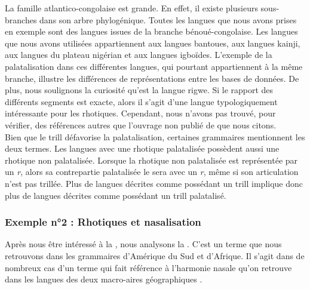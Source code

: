 La famille atlantico-congolaise est grande. En effet, il existe plusieurs sous-branches dans son arbre phylogénique. Toutes les langues que nous avons prises en exemple sont des langues issues de la branche bénoué-congolaise. Les langues que nous avons utilisées appartiennent aux langues bantoues, aux langues kainji, aux langues du plateau nigérian et aux langues igboïdes. L'exemple de la palatalisation dans ces différentes langues, qui pourtant appartiennent à la même branche, illustre les différences de représentations entre les bases de données. De plus, nous soulignons la curiosité qu'est la langue rigwe. Si le rapport des différents segments est exacte, alors il s'agit d'une langue typologiquement intéressante pour les rhotiques. Cependant, nous n'avons pas trouvé, pour vérifier, des références autres que l'ouvrage non publié de \textcite{danielPhonologyRigweLanguage2008} que nous citons.\\

Bien que le trill défavorise la palatalisation, certaines grammaires mentionnent les deux termes. Les langues avec une rhotique palatalisée possèdent aussi une rhotique non palatalisée. Lorsque la rhotique non palatalisée est représentée par un \textit{r}, alors sa contrepartie palatalisée le sera avec un \textit{r}, même si son articulation n'est pas trillée. Plus de langues décrites comme possédant un trill implique donc plus de langues décrites comme possédant un trill palatalisé.




\subsubsection{Exemple n°2 : Rhotiques et nasalisation}

Après nous être intéressé à la , nous analysons la . C'est un terme que nous retrouvons dans les grammaires d'Amérique du Sud et d'Afrique. Il s'agit dans de nombreux cas d'un terme qui fait référence à l'harmonie nasale qu'on retrouve dans les langues des deux macro-aires géographiques \parencite{pengNasalHarmonyThree2000,clementsIkwereNasalHarmony2003,clementsNasalHarmonyIkwere2005}.\\

